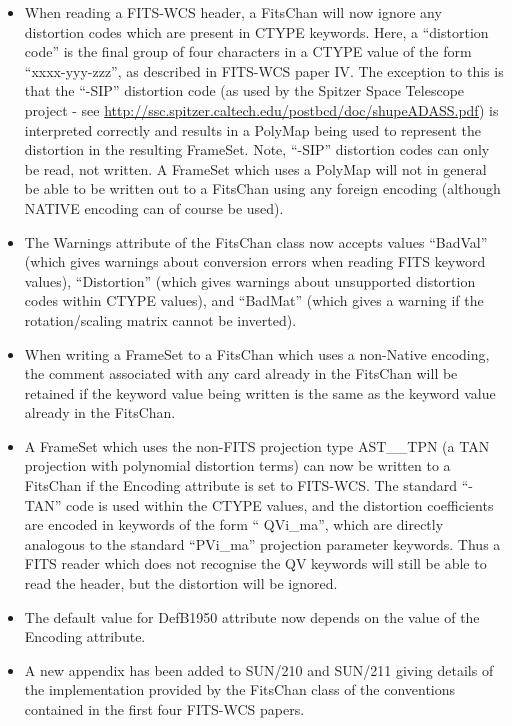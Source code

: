 \documentclass[twoside,11pt]{starlink}
\begin{document}
\begin{enumerate}
\begin{itemize}
\item When reading a FITS-WCS header, a FitsChan will now ignore any
distortion codes which are present in CTYPE keywords. Here, a ``distortion
code'' is the final group of four characters in a CTYPE value of the
form ``xxxx-yyy-zzz'', as described in FITS-WCS paper IV. The exception
to this is that the ``-SIP'' distortion code (as used by the Spitzer
Space Telescope project - see
\url{http://ssc.spitzer.caltech.edu/postbcd/doc/shupeADASS.pdf}) is
interpreted correctly and results in a PolyMap being used to represent
the distortion in the resulting FrameSet. Note, ``-SIP'' distortion codes
can only be read, not written. A FrameSet which uses a PolyMap will not
in general be able to be written out to a FitsChan using any foreign
encoding (although NATIVE encoding can of course be used).

\item The Warnings attribute of the FitsChan class now accepts values
``BadVal'' (which gives warnings about conversion errors when reading
FITS keyword values), ``Distortion'' (which gives warnings about
unsupported distortion codes within CTYPE values), and ``BadMat'' (which
gives a warning if the rotation/scaling matrix cannot be inverted).

\item When writing a FrameSet to a FitsChan which uses a non-Native
encoding, the comment associated with any card already in the FitsChan
will be retained if the keyword value being written is the same as the
keyword value already in the FitsChan.

\item A FrameSet which uses the non-FITS projection type AST\_\_TPN (a TAN
projection with polynomial distortion terms) can now be written to a
FitsChan if the Encoding attribute is set to FITS-WCS. The standard
``-TAN'' code is used within the CTYPE values, and the distortion
coefficients are encoded in keywords of the form `` QVi\_ma'', which are
directly analogous to the standard ``PVi\_ma'' projection parameter keywords.
Thus a FITS reader which does not recognise the QV keywords will still
be able to read the header, but the distortion will be ignored.

\item The default value for DefB1950 attribute now depends on the value
of the Encoding attribute.

\item A new appendix has been added to SUN/210 and SUN/211 giving details
of the implementation provided by the FitsChan class of the
conventions contained in the first four FITS-WCS papers.
\end{itemize}


\end{enumerate}
\end{document}
